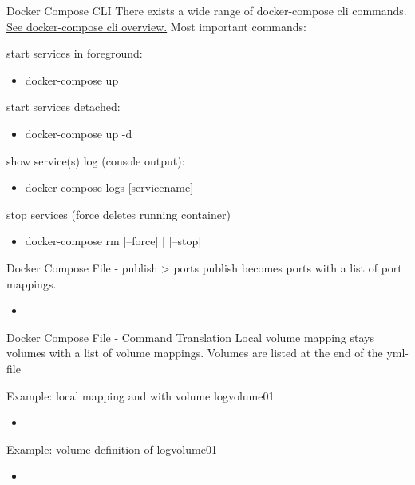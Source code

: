 \documentclass[10pt,aspectratio=\ratio,
compress
]{beamer}
\begin{document}
\begin{frame}{Docker Compose CLI}
There exists a wide range of docker-compose cli commands.
\href{https://docs.docker.com/compose/reference/overview/}{See docker-compose cli overview.} Most important commands:

start services in foreground:
\begin{itemize}
	\item docker-compose up
\end{itemize}
start services detached:
\begin{itemize}
	\item docker-compose up -d
\end{itemize}
show service(s) log (console output):
\begin{itemize}
	\item docker-compose logs [servicename]
\end{itemize}
stop services (force deletes running container)
\begin{itemize}
	\item docker-compose rm [--force] | [--stop]
\end{itemize}

\end{frame}

\begin{frame}{Docker Compose File - publish > ports}
publish becomes ports with a list of port mappings.

\begin{itemize}
	\item 	%
\end{itemize}
\end{frame}

\begin{frame}{Docker Compose File - Command Translation}
Local volume mapping stays volumes with a list of volume mappings.
Volumes are listed at the end of the yml-file

Example: local mapping and with volume logvolume01
\begin{itemize}
	\item 	%
\end{itemize}

Example: volume definition of logvolume01
\begin{itemize}
	\item 	%
\end{itemize}
\end{frame}
\end{document}
